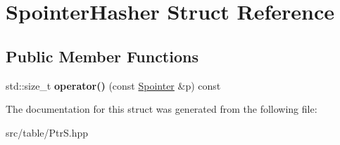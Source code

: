 \hypertarget{structSpointerHasher}{}\section{Spointer\+Hasher Struct Reference}
\label{structSpointerHasher}
\subsection*{Public Member Functions}
\begin{DoxyCompactItemize}
\item 
\mbox{\label{structSpointerHasher_abf1bf4b8162161d2defd1ec4d65594f4}} 
std\+::size\+\_\+t {\bfseries operator()} (const \mbox{\hyperlink{classSpointer}{Spointer}} \&p) const
\end{DoxyCompactItemize}


The documentation for this struct was generated from the following file\+:\begin{DoxyCompactItemize}
\item 
src/table/Ptr\+S.\+hpp\end{DoxyCompactItemize}
